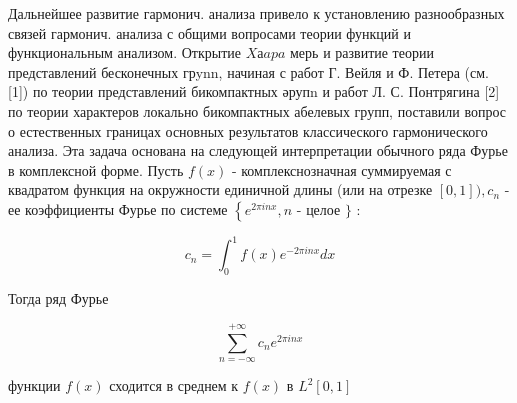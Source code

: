 \documentclass[10pt]{article}
\begin{document}
Дальнейшее развитие гармонич. анализа привело к установлению разнообразных связей гармонич. анализа с общими вопросами теории функций и функциональным анализом. Открытие $X а a p a$ мерь и развитие теории представлений бесконечных грynn, начиная с работ Г. Вейля и Ф. Петера (см. [1]) по теории представлений бикомпактных әрупn и работ Л. С. Понтрягина [2] по теории характеров локально бикомпактных абелевых групп, поставили вопрос о естественных границах основных результатов классического гармонического анализа. Эта задача основана на следующей интерпретации обычного ряда Фурье в комплексной форме. Пусть $f(x)$ - комплекснозначная суммируемая с квадратом функция на окружности единичной длины (или на отрезке $[0,1]), c_{n}$ - ее коэффициенты Фурье по системе $\left\{e^{2 \pi i n x}, n\right.$ - целое $\}$ :



\[

c_{n}=\int_{0}^{1} f(x) e^{-2 \pi i n x} d x

\]



Тогда ряд Фурье



\[

\sum_{n=-\infty}^{+\infty} c_{n} e^{2 \pi i n x}

\]



функции $f(x)$ сходится в среднем к $f(x)$ в $L^{2}[0,1]$
\end{document}
